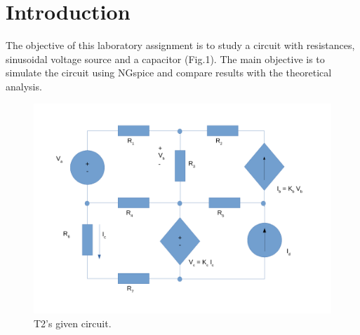 \section{Introduction}
\label{sec:introduction}

The objective of this laboratory assignment is to study a circuit with resistances, sinusoidal voltage source and a capacitor (Fig.1). The main objective is to simulate the circuit using NGspice and compare results with the theoretical analysis. \par

\begin{figure}[H] \centering
\includegraphics[width=0.6\linewidth]{circuito.pdf}
\caption{T2's given circuit.}
\label{fig:circuito}
\end{figure}

